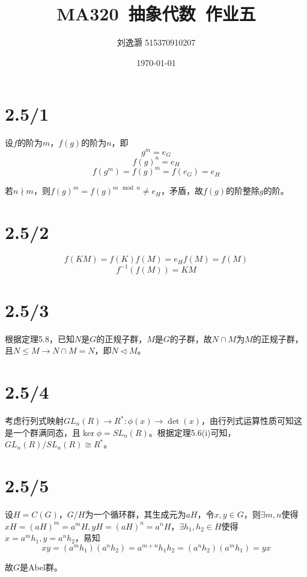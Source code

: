 \documentclass{article}
\title{MA320\ 抽象代数\ 作业五}
\author{刘逸灏 515370910207}
\date{\today}
\begin{document}
\maketitle

\section{2.5/1}
设$f$的阶为$m$，$f(g)$的阶为$n$，即 
$$g^m=e_G$$
$$f(g)^n=e_H$$
$$f(g^m)=f(g)^m=f(e_G)=e_H$$

若$n\nmid m$，则$f(g)^m=f(g)^{m\mod n}\neq e_H$，矛盾，故$f(g)$的阶整除$g$的阶。

\section{2.5/2}
$$f(KM)=f(K)f(M)=e_Hf(M)=f(M)$$
$$f^{-1}(f(M))=KM$$

\section{2.5/3}
根据定理5.8，已知$N$是$G$的正规子群，$M$是$G$的子群，故$N\cap M$为$M$的正规子群，且$N\leqslant M\to N\cap M=N$，即$N\lhd M$。

\section{2.5/4}
考虑行列式映射$GL_n(R)\to R^*:\phi(x)\to\det(x)$，由行列式运算性质可知这是一个群满同态，且$\ker\phi=SL_n(R)$。根据定理5.6(i)可知，$GL_n(R)/SL_n(R)\cong R^*$。

\section{2.5/5}
设$H=C(G)$，$G/H$为一个循环群，其生成元为$aH$，令$x,y \in G$，则$\exists m,n$使得$xH=(aH)^m=a^mH,yH=(aH)^n=a^nH$，$\exists h_1,h_2\in H$使得$x=a^mh_1,y=a^nh_2$，易知
$$xy=(a^mh_1)(a^nh_2)=a^{m+n}h_1h_2=(a^nh_2)(a^mh_1)=yx$$

故$G$是Abel群。
\end{document}
